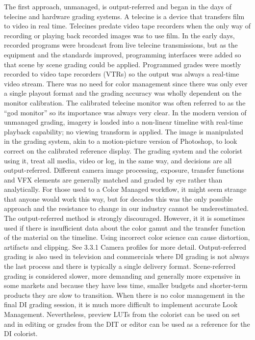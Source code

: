 The first approach, unmanaged, is output-referred and began in the days of telecine and hardware grading systems. A telecine is a device that transfers film to video in real time. Telecines predate video tape recorders when the only way of recording or playing back recorded images was to use film. In the early days, recorded programs were broadcast from live telecine transmissions, but as the equipment and the standards improved, programming interfaces were added so that scene by scene grading could be applied. Programmed grades were mostly recorded to video tape recorders (VTRs) so the output was always a real-time video stream. There was no need for color management since there was only ever a single playout format and the grading accuracy was wholly dependent on the monitor calibration. The calibrated telecine monitor was often referred to as the “god monitor” so its importance was always very clear. In the modern version of unmanaged grading, imagery is loaded into a non-linear timeline with real-time playback capability; no viewing transform is applied. The image is manipulated in the grading system, akin to a motion-picture version of Photoshop, to look correct on the calibrated reference display. The grading system and the colorist using it, treat all media, video or log, in the same way, and decisions are all output-referred. Different camera image processing, exposure, transfer functions and VFX elements are generally matched and graded by eye rather than analytically. For those used to a Color Managed workflow, it might seem strange that anyone would work this way, but for decades this was the only possible approach and the resistance to change in our industry cannot be underestimated. The output-referred method is strongly discouraged. However, it it is sometimes used if there is insufficient data about the color gamut and the transfer function of the material on the timeline. Using incorrect color science can cause distortion, artifacts and clipping. See 3.3.1 Camera profiles for more detail. Output-referred grading is also used in television and commercials where DI grading is not always the last process and there is typically a single delivery format. Scene-referred grading is considered slower, more demanding and generally more expensive in some markets and because they have less time, smaller budgets and shorter-term products they are slow to transition. When there is no color management in the final DI grading session, it is much more difficult to implement accurate Look Management. Nevertheless, preview LUTs from the colorist can be used on set and in editing or grades from the DIT or editor can be used as a reference for the DI colorist.

